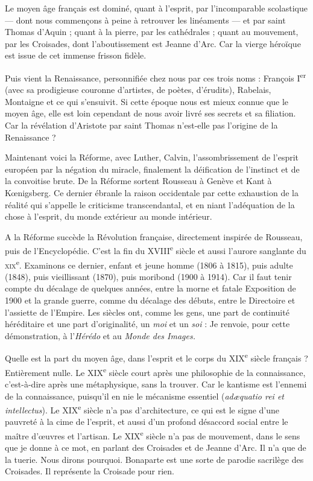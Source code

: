 \documentclass[french,twoside]{book} %
\begin{document}
Le moyen âge français est dominé, quant à l’esprit, par l’incomparable scolastique — dont nous commençons à peine à retrouver les linéaments — et par saint Thomas d’Aquin ; quant à la pierre, par les cathédrales ; quant au mouvement, par les Croisades, dont l’aboutissement est Jeanne d’Arc. Car la vierge héroïque est issue de cet immense frisson fidèle.\par
Puis vient la Renaissance, personnifiée chez nous par ces trois noms : François I\textsuperscript{er} (avec sa prodigieuse couronne d’artistes, de poètes, d’érudits), Rabelais, Montaigne et ce qui s’ensuivit. Si cette époque nous est mieux connue que le moyen âge, elle est loin cependant de nous avoir livré ses secrets et sa filiation. Car la révélation d’Aristote par saint Thomas n’est-elle pas l’origine de la Renaissance ?\par
Maintenant voici la Réforme, avec Luther, Calvin, l’assombrissement de l’esprit européen par la négation du miracle, finalement la déification de l’instinct et de la convoitise brute. De la Réforme sortent Rousseau à Genève et Kant à Kœnigsberg. Ce dernier ébranle la raison occidentale par cette exhaustion de la réalité qui s’appelle le criticisme transcendantal, et en niant l’adéquation de la chose à l’esprit, du monde extérieur au monde intérieur.\par
A la Réforme succède la Révolution française, directement inspirée de Rousseau, puis de l’Encyclopédie. C’est la fin du XVIII\textsuperscript{e} siècle et aussi l’aurore sanglante du \textsc{xix}\textsuperscript{e}. Examinons ce dernier, enfant et jeune homme (1806 à 1815), puis adulte (1848), puis vieillissant (1870), puis moribond (1900 à 1914). Car il faut tenir compte du décalage de quelques années, entre la morne et fatale Exposition de 1900 et la grande guerre, comme du décalage des débuts, entre le Directoire et l’assiette de l’Empire. Les siècles ont, comme les gens, une part de continuité héréditaire et une part d’originalité, un {\itshape moi} et un {\itshape soi} : Je renvoie, pour cette démonstration, à l’{\itshape Hérédo} et au {\itshape Monde des Images.}\par
Quelle est la part du moyen âge, dans l’esprit et le corps du XIX\textsuperscript{e} siècle français ? Entièrement nulle. Le XIX\textsuperscript{e} siècle court après une philosophie de la connaissance, c’est-à-dire après une métaphysique, sans la trouver. Car le kantisme est l’ennemi de la connaissance, puisqu’il en nie le mécanisme essentiel ({\itshape adæquatio rei et intellectus}). Le XIX\textsuperscript{e} siècle n’a pas d’architecture, ce qui est le signe d’une pauvreté à la cime de l’esprit, et aussi d’un profond désaccord social entre le maître d’œuvres et l’artisan. Le XIX\textsuperscript{e} siècle n’a pas de mouvement, dans le sens que je donne à ce mot, en parlant des Croisades et de Jeanne d’Arc. Il n’a que de la tuerie. Nous dirons pourquoi. Bonaparte est une sorte de parodie sacrilège des Croisades. Il représente la Croisade pour rien.\par
\end{document}
